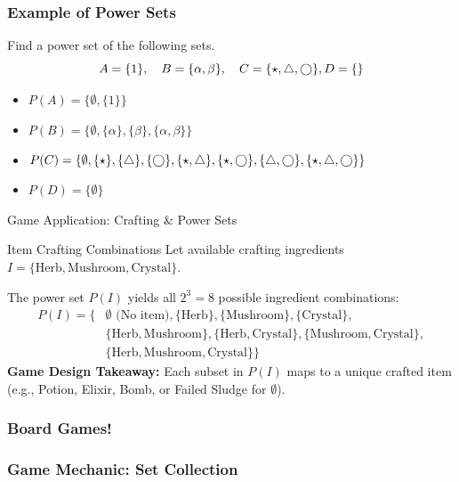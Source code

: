 \begin{frame}[t]
\frametitle{Example of Power Sets}
\begin{ex}
Find a power set of the following sets.
\[A = \{1\}, \quad B = \{\alpha, \beta\}, \quad C = \{\star, \bigtriangleup, \bigcirc\}, D = \{\}\]
\end{ex}
\begin{sol}
\begin{itemize}
\item $P(A) = \{ \emptyset, \{1\}\}$
\item $P(B) = \{ \emptyset, \{\alpha\}, \{\beta\}, \{\alpha, \beta\}\}$
\item $P(C) = \{ \emptyset, \{\star\}, \{\bigtriangleup\}, \{\bigcirc\}, \{\star, \bigtriangleup\}, \{\star, \bigcirc\}, \{\bigtriangleup, \bigcirc\}, \{\star, \bigtriangleup, \bigcirc\}\}$
\item $P(D) = \{ \emptyset\}$
\end{itemize}
\end{sol}
\end{frame}

\begin{frame}{Game Application: Crafting \& Power Sets}
\begin{block}{Item Crafting Combinations}
Let available crafting ingredients $I = \{\text{Herb}, \text{Mushroom}, \text{Crystal}\}$.
\end{block}
The power set $P(I)$ yields all $2^3 = 8$ possible ingredient combinations:
\begin{align*}
P(I) = \{ & \emptyset \text{ (No item)}, \{\text{Herb}\}, \{\text{Mushroom}\}, \{\text{Crystal}\}, \\
& \{\text{Herb}, \text{Mushroom}\}, \{\text{Herb}, \text{Crystal}\}, \{\text{Mushroom}, \text{Crystal}\}, \\
& \{\text{Herb}, \text{Mushroom}, \text{Crystal}\} \}
\end{align*}
\tcblower
\textbf{Game Design Takeaway:} Each subset in $P(I)$ maps to a unique crafted item (e.g., Potion, Elixir, Bomb, or Failed Sludge for $\emptyset$).
\end{frame}

\begin{frame}
\frametitle{Board Games!}
\end{frame}

\begin{frame}
\frametitle{Game Mechanic: Set Collection}
\end{frame}
